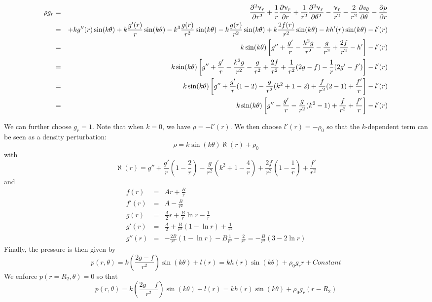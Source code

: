 \begin{eqnarray}
\rho g_r 
&=& 
 \frac{\partial^2 \upnu_r}{\partial r^2} 
+ \frac{1}{r} \frac{\partial \upnu_r}{\partial r} 
+ \frac{1}{r^2} \frac{\partial^2 \upnu_r}{\partial \theta^2}
- \frac{\upnu_r}{r^2} 
- \frac{2}{r^2} \frac{\partial v_\theta}{\partial \theta} 
-\frac{\partial p}{\partial r}  \nonumber\\
&=& 
+ k g''(r) \sin (k \theta) 
+ k \frac{g'(r)}{r} \sin (k \theta) 
- k^3 \frac{g(r)}{r^2} \sin(k\theta) 
- k \frac{g(r)}{r^2} \sin(k \theta) 
+ k \frac{2f(r)}{r^2}  \sin(k \theta)
- k h'(r) \sin(k \theta) 
- l'(r) \nonumber\\
&=& k \sin(k\theta)
\left[ g'' + \frac{g'}{r} - \frac{k^2 g }{r^2} - \frac{g}{r^2} + \frac{2f}{r^2} - h'  \right] - l'(r) \nonumber\\
&=& k \sin(k\theta)
\left[ g'' + \frac{g'}{r} - \frac{k^2 g }{r^2} - \frac{g}{r^2} + \frac{2f}{r^2} + \frac{1}{r^2} (2g-f) - \frac{1}{r} (2g'-f')   \right] - l'(r) \nonumber\\
&=& k \sin(k\theta)
\left[ g'' + \frac{g'}{r} ( 1 - 2) - \frac{g}{r^2} (k^2 + 1 -2)  + \frac{f}{r^2}  (2-1)  + \frac{f'}{r}   \right] - l'(r) \nonumber\\
&=& k \sin(k\theta)
\left[ g'' - \frac{g'}{r}  - \frac{g}{r^2} (k^2 - 1)  + \frac{f}{r^2}   + \frac{f'}{r}   \right] - l'(r) 
\end{eqnarray}

We can further choose $g_r=1$. Note that when $k=0$, we have $\rho = -l'(r) $.
We then choose $l'(r)=-\rho_0$ so that the $k$-dependent term can be seen as a density perturbation:
\[
\rho = k \sin (k \theta) \aleph(r) + \rho_0
\]
with 
\[
\aleph(r) = 
g'' + \frac{g'}{r} ( 1 - \frac{2}{r}) - \frac{g}{r^2} (k^2 + 1 -\frac{4}{r}) + \frac{2f}{r^2}  (1-\frac{1}{r}) + \frac{f'}{r^2}  
\]
and
\begin{eqnarray}
f(r)   &=& Ar +\frac{B}{r}\\
f'(r)  &=& A - \frac{B}{r^2}\\
g(r)   &=& \frac{A}{2}r  +  \frac{B}{r} \ln r - \frac{1}{r}\\
g'(r)  &=& \frac{A}{2}  +  \frac{B}{r^2} (1-\ln r)   + \frac{1}{r^2}\\
g''(r) &=& -\frac{2B}{r^3} (1-\ln r)  - B \frac{1}{r^3}  - \frac{2}{r^3} = - \frac{B}{r^3} (3 - 2 \ln r ) 
\end{eqnarray}
Finally, the pressure is then given by 
\[
p(r,\theta)= k\left(  \frac{2g-f}{r^2} \right) \sin(k \theta) +  l(r)
= k h(r) \sin(k \theta) + \rho_0 g_r r + Constant
\]
We enforce $p(r=R_2,\theta)=0$ so that 
\[
p(r,\theta)= k\left(  \frac{2g-f}{r^2} \right) \sin(k \theta) +  l(r)
= k h(r) \sin(k \theta) + \rho_0 g_r (r-R_2) 
\]

